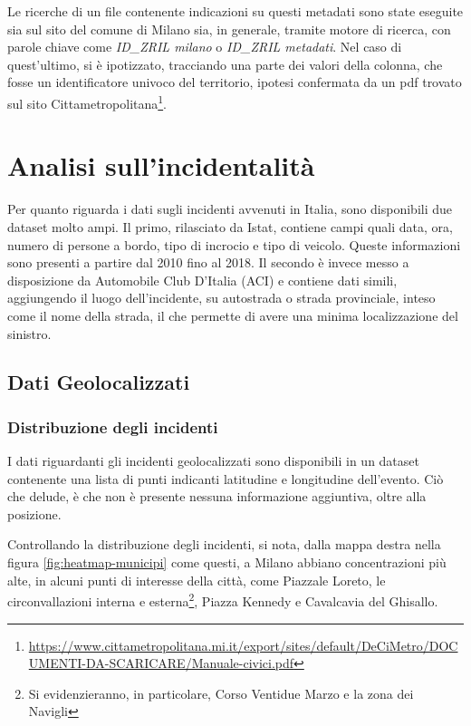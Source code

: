 \documentclass[a4paper,12pt]{report}
\newcommand{\quotestyle}[1]{\textit{#1}}
\begin{document}
Le ricerche di un file contenente indicazioni su questi metadati sono state eseguite sia 
sul sito del comune di Milano sia, in generale, tramite motore di ricerca, con parole chiave 
come \quotestyle{ID\_ZRIL milano} o \quotestyle{ID\_ZRIL metadati}. 
Nel caso di quest'ultimo, si è ipotizzato, tracciando una parte dei valori della colonna, 
che fosse un identificatore univoco del territorio, ipotesi confermata 
da un pdf trovato sul sito 
Cittametropolitana\footnote{\url{https://www.cittametropolitana.mi.it/export/sites/default/DeCiMetro/DOCUMENTI-DA-SCARICARE/Manuale-civici.pdf}}. 

\chapter{Analisi sull'incidentalità}

Per quanto riguarda i dati sugli incidenti avvenuti in Italia, 
sono disponibili due dataset molto ampi. 
Il primo, rilasciato da Istat, contiene campi quali data, ora, 
numero di persone a bordo, tipo di incrocio e tipo di veicolo. 
Queste informazioni sono presenti a partire dal 2010 fino al 2018. 
Il secondo è invece messo a disposizione da Automobile Club D'Italia (ACI) 
e contiene dati simili, 
aggiungendo il luogo dell'incidente, su autostrada o strada provinciale, 
inteso come il nome della strada, il che permette di avere una minima localizzazione del 
sinistro. 

\section{Dati Geolocalizzati}

\subsection{Distribuzione degli incidenti}

I dati riguardanti gli incidenti geolocalizzati sono disponibili in un dataset 
contenente una lista di punti indicanti latitudine e longitudine dell'evento. 
Ciò che delude, è che non è presente nessuna informazione aggiuntiva, 
oltre alla posizione. 

Controllando la distribuzione degli incidenti, 
si nota, dalla mappa destra nella figura \ref{fig:heatmap-municipi} come questi, 
a Milano abbiano concentrazioni più alte, 
in alcuni punti di interesse della città, come Piazzale Loreto, le circonvallazioni 
interna e esterna\footnote{Si evidenzieranno, in particolare, Corso Ventidue Marzo 
e la zona dei Navigli}, Piazza Kennedy e Cavalcavia del Ghisallo. 
\end{document}
